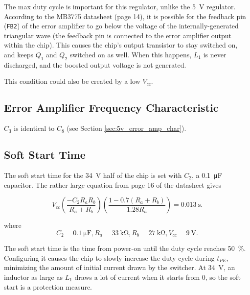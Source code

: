\documentclass{article}
\newcommand{\Vcc}{$V_{cc}$}
\newcommand{\chippin}{\texttt}
\newcommand{\model}{\textsf}
\begin{document}

The max duty cycle is important for this regulator, unlike the
\qty{5}{\volt} regulator. According to the \model{MB3775} datasheet
(page 14), it is possible for the feedback pin (\chippin{FB2}) of the
error amplifier to go below the voltage of the internally-generated
triangular wave (the feedback pin is connected to the error amplifier
output within the chip). This causes the chip's output transistor to
stay switched on, and keeps $Q_1$ and $Q_2$ switched on as well. When
this happens, $L_1$ is never discharged, and the boosted output
voltage is not generated.

This condition could also be created by a low \Vcc{}.
\subsection{Error Amplifier Frequency Characteristic}
$C_3$ is identical to $C_8$ (see Section \ref{sec:5v_error_amp_char}).

\subsection{Soft Start Time}
\label{sec:soft_start_time}
The soft start time for the \qty{34}{\volt} half of the chip is set
with $C_2$, a \qty{0.1}{\micro\farad} capacitor. The rather large
equation from page 16 of the datasheet gives

\begin{displaymath}
  V_{cc}\left(\frac{-C_2R_aR_b}{R_a+R_b}\right)\left(\frac{1-0.7(R_a+R_b)}{1.28R_a}\right)
  = \qty{0.013}{\second}.
\end{displaymath}

\noindent
where
\begin{displaymath}
  C_2 = \qty{0.1}{\micro\farad},R_a =
  \qty{33}{\kilo\ohm},R_b=\qty{27}{\kilo\ohm},V_{cc} = \qty{9}{\volt}.
\end{displaymath}

The soft start time is the time from power-on until the duty cycle
reaches \qty{50}{\%}. Configuring it causes the chip to slowly
increase the duty cycle during $t_{PE}$, minimizing the amount of
initial current drawn by the switcher. At \qty{34}{\volt}, an inductor
as large as $L_1$ draws a lot of current when it starts from 0, so the
soft start is a protection measure.
\end{document}
